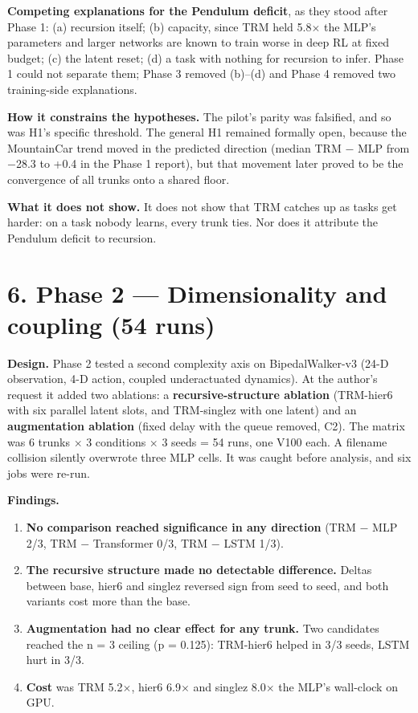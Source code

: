 \documentclass[11pt]{article}
\begin{document}
\textbf{Competing explanations for the Pendulum deficit}, as they stood after Phase 1: (a) recursion itself; (b) capacity, since TRM held 5.8$\times$ the MLP's parameters and larger networks are known to train worse in deep RL at fixed budget; (c) the latent reset; (d) a task with nothing for recursion to infer. Phase 1 could not separate them; Phase 3 removed (b)--(d) and Phase 4 removed two training-side explanations.



\textbf{How it constrains the hypotheses.} The pilot's parity was falsified, and so was H1's specific threshold. The general H1 remained formally open, because the MountainCar trend moved in the predicted direction (median TRM $-$ MLP from $-$28.3 to +0.4 in the Phase 1 report), but that movement later proved to be the convergence of all trunks onto a shared floor.



\textbf{What it does not show.} It does not show that TRM catches up as tasks get harder: on a task nobody learns, every trunk ties. Nor does it attribute the Pendulum deficit to recursion.



\medskip



\section*{6. Phase 2 --- Dimensionality and coupling (54 runs)}



\textbf{Design.} Phase 2 tested a second complexity axis on BipedalWalker-v3 (24-D observation, 4-D action, coupled underactuated dynamics). At the author's request it added two ablations: a \textbf{recursive-structure ablation} (TRM-hier6 with six parallel latent slots, and TRM-singlez with one latent) and an \textbf{augmentation ablation} (fixed delay with the queue removed, C2). The matrix was 6 trunks $\times$ 3 conditions $\times$ 3 seeds = 54 runs, one V100 each. A filename collision silently overwrote three MLP cells. It was caught before analysis, and six jobs were re-run.



\textbf{Findings.}

\begin{enumerate}
\item \textbf{No comparison reached significance in any direction} (TRM $-$ MLP 2/3, TRM $-$ Transformer 0/3, TRM $-$ LSTM 1/3).
\item \textbf{The recursive structure made no detectable difference.} Deltas between base, hier6 and singlez reversed sign from seed to seed, and both variants cost more than the base.
\item \textbf{Augmentation had no clear effect for any trunk.} Two candidates reached the n = 3 ceiling (p = 0.125): TRM-hier6 helped in 3/3 seeds, LSTM hurt in 3/3.
\item \textbf{Cost} was TRM 5.2$\times$, hier6 6.9$\times$ and singlez 8.0$\times$ the MLP's wall-clock on GPU.
\end{enumerate}
\end{document}
